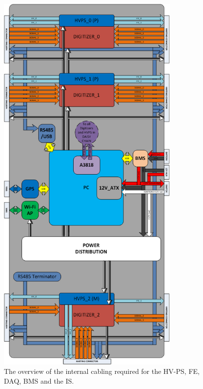 \begin{figure}[htbp]
\begin{center}
\includegraphics[width=90mm]{Chapter6/figures/electronicsSetupDiagram.png}
\caption{The overview of the internal cabling required for the HV-PS, FE, DAQ, BMS and the IS.}
\label{fig:electronicsDiagram}
\end{center}
\end{figure}

